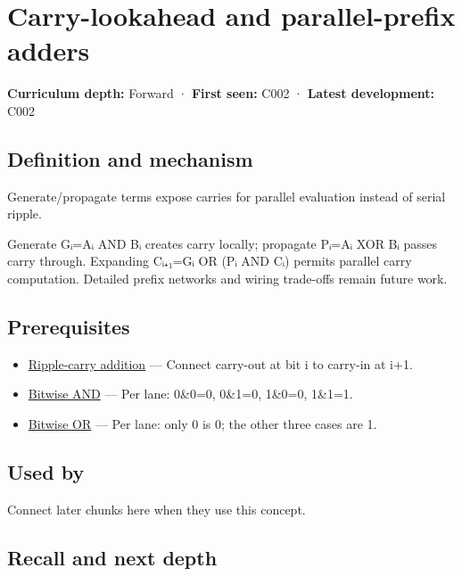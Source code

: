 \hypertarget{appendix-b5c46b2d94ff}{}\label{referencestart:appendix-b5c46b2d94ff}
\section{Carry-lookahead and parallel-prefix adders}\label{appendix-b5c46b2d94ff-carry-lookahead-and-parallel-prefix-adders}

\textbf{Curriculum depth:} Forward · \textbf{First seen:} C002 · \textbf{Latest development:} C002

\subsection{Definition and mechanism}\label{appendix-b5c46b2d94ff-definition-and-mechanism}

Generate/propagate terms expose carries for parallel evaluation instead of serial ripple.

Generate Gᵢ=Aᵢ AND Bᵢ creates carry locally; propagate Pᵢ=Aᵢ XOR Bᵢ passes carry through. Expanding Cᵢ₊₁=Gᵢ OR (Pᵢ AND Cᵢ) permits parallel carry computation. Detailed prefix networks and wiring trade-offs remain future work.

\subsection{Prerequisites}\label{appendix-b5c46b2d94ff-prerequisites}

\begin{itemize}
\tightlist
\item
  \hyperref[appendix-17917d9fdbe3]{Ripple-carry addition} --- Connect carry-out at bit i to carry-in at i+1.
\item
  \hyperref[appendix-68b52453737c]{Bitwise AND} --- Per lane: 0\&0=0, 0\&1=0, 1\&0=0, 1\&1=1.
\item
  \hyperref[appendix-a427ce8ce8a6]{Bitwise OR} --- Per lane: only 0 is 0; the other three cases are 1.
\end{itemize}

\subsection{Used by}\label{appendix-b5c46b2d94ff-used-by}

Connect later chunks here when they use this concept.

\subsection{Recall and next depth}\label{appendix-b5c46b2d94ff-recall-and-next-depth}

